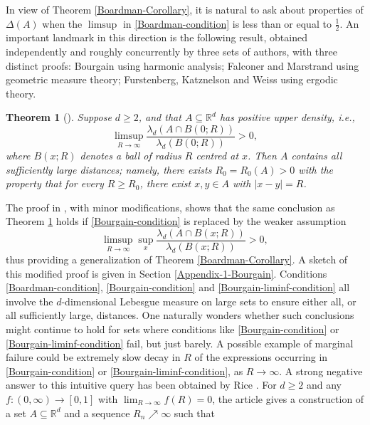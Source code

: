 \documentclass[a4paper,11pt]{amsart}
\newtheorem{theorem}{Theorem}
\numberwithin{equation}{section}
\begin{document}
\noindent In view of Theorem \ref{Boardman-Corollary}, it is natural to ask about properties of $\Delta(A)$ when the $\limsup$ in \eqref{Boardman-condition} is less than or equal to $\frac12$. An important landmark in this direction is the following result, obtained independently and roughly concurrently by three sets of authors, with three distinct proofs:  Bourgain \cite{1986Bourgain} using harmonic analysis; Falconer and Marstrand \cite{Falconer-Marstrand-1986} using geometric measure theory; Furstenberg, Katznelson and Weiss \cite{FKW-1990} using ergodic theory.             
\begin{theorem}[\cite{{1986Bourgain}, {Falconer-Marstrand-1986},{FKW-1990}}] \label{all-large-dist-thm}
Suppose $d \geq 2$, and that $A \subseteq \mathbb R^d$ has positive upper density, i.e., 
\begin{equation}  \limsup_{R \rightarrow \infty} \frac{\lambda_d(A \cap B(0;R))}{\lambda_d(B(0;R))} > 0, \label{Bourgain-condition} \end{equation} 
where $B(x;R)$ denotes a ball of radius $R$ centred at $x$. Then $A$ contains all sufficiently large distances; namely, there exists $R_0 = R_0(A) > 0$ with the property that for every $R \geq R_0$, there exist $x, y \in A$ with $|x-y| = R$. 
\end{theorem}
\noindent The proof in \cite{1986Bourgain}, with minor modifications, shows that the same conclusion as Theorem \ref{all-large-dist-thm} holds if \eqref{Bourgain-condition} is replaced by the weaker assumption
\begin{equation} \label{Bourgain-liminf-condition} 
\limsup_{R \rightarrow \infty} \sup_x \frac{\lambda_d(A \cap B(x;R))}{\lambda_d(B(x;R))} > 0,
\end{equation} 
thus providing a generalization of Theorem \ref{Boardman-Corollary}. A sketch of this modified proof is given in Section \ref{Appendix-1-Bourgain}. 
\vskip0.1in 
\noindent Conditions \eqref{Boardman-condition}, \eqref{Bourgain-condition} and \eqref{Bourgain-liminf-condition} all involve the $d$-dimensional Lebesgue measure on large sets to ensure either all, or all sufficiently large, distances. One naturally wonders whether such conclusions might continue to hold for sets where conditions like \eqref{Bourgain-condition} or \eqref{Bourgain-liminf-condition} fail, but just barely. A possible example of marginal failure could be extremely slow decay in $R$ of the expressions occurring in \eqref{Bourgain-condition} or \eqref{Bourgain-liminf-condition}, as $R \rightarrow \infty$. A strong negative answer to this intuitive query has been obtained by Rice \cite{2020Rice}. For $d \geq 2$ and any $f:(0, \infty) \rightarrow [0,1]$ with $\lim_{R \rightarrow \infty}f(R) = 0$, the article \cite{2020Rice} gives a construction of a set $A \subseteq \mathbb R^d$ and a sequence $R_n \nearrow \infty$ such that 
\end{document}
